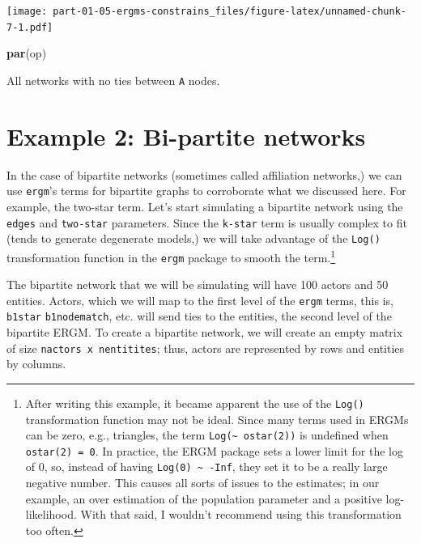 \documentclass[]{book}
\newenvironment{Shaded}{\begin{snugshade}}{\end{snugshade}}
\newcommand{\KeywordTok}[1]{\textcolor[rgb]{0.13,0.29,0.53}{\textbf{#1}}}
\newcommand{\NormalTok}[1]{#1}
\begin{document}
\texttt{[image: part-01-05-ergms-constrains\_files/figure-latex/unnamed-chunk-7-1.pdf]}

\begin{Shaded}
\begin{Highlighting}[]
\KeywordTok{par}\NormalTok{(op)}
\end{Highlighting}
\end{Shaded}

All networks with no ties between \texttt{A} nodes.

\hypertarget{example-2-bi-partite-networks}{%
\section{Example 2: Bi-partite networks}\label{example-2-bi-partite-networks}}

In the case of bipartite networks (sometimes called affiliation networks,) we can
use \texttt{ergm}'s terms for bipartite graphs to corroborate what we discussed
here. For example, the two-star term. Let's start simulating a bipartite
network using the \texttt{edges} and \texttt{two-star} parameters. Since the \texttt{k-star} term
is usually complex to fit (tends to generate degenerate models,) we will
take advantage of the \texttt{Log()} transformation function in the \texttt{ergm} package
to smooth the term.\footnote{After writing this example, it became apparent the use of
  the \texttt{Log()} transformation function may not be ideal. Since many terms used
  in ERGMs can be zero, e.g., triangles, the term \texttt{Log(\textasciitilde{}\ ostar(2))} is undefined
  when \texttt{ostar(2)\ =\ 0}. In practice, the ERGM package sets a lower limit for the
  log of 0, so, instead of having \texttt{Log(0)\ \textasciitilde{}\ -Inf}, they set it to be a really
  large negative number. This causes all sorts of issues to the estimates; in
  our example, an over estimation of the population parameter and a positive
  log-likelihood. With that said, I wouldn't recommend using
  this transformation too often.}

The bipartite network that we will be simulating will have 100 actors and
50 entities. Actors, which we will map to the first level of the \texttt{ergm} terms,
this is, \texttt{b1star} \texttt{b1nodematch}, etc. will send ties to the entities,
the second level of the bipartite ERGM. To create a bipartite network, we will
create an empty matrix of size \texttt{nactors\ x\ nentitites}; thus, actors are
represented by rows and entities by columns.
\end{document}
